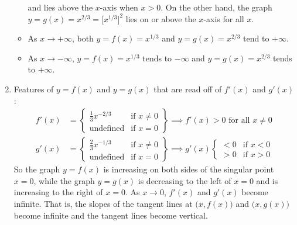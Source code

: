 \begin{eg}[Optional ---  $y=x^{1/3}$ and $y = x^{2/3}$]
\begin{enumerate}[(1)]
\begin{itemize}
   and lies above the $x$-axis when $x>0$. On the other hand, the graph
   $y=g(x)=x^{2/3}=\big[x^{1/3}\big]^2$ lies on or above the $x$-axis for all
   $x$.
  \item As $x\rightarrow+\infty$,  both $y=f(x)=x^{1/3}$ and   
   $y=g(x)=x^{2/3}$ tend to $+\infty$.
  \item As $x\rightarrow-\infty$, $y=f(x)=x^{1/3}$ tends to $-\infty$ and   
   $y=g(x)=x^{2/3}$ tends to $+\infty$.
\end{itemize}
\item Features of $y=f(x)$ and $y=g(x)$ that are read off of $f'(x)$ 
      and $g'(x)$:
      \begin{align*}
         f'(x) &=  \left.\begin{cases}
                      \tfrac{1}{3}x^{-2/3} & \text{if }x\ne 0 \\
                      \text{undefined} & \text{if }x =0  
              \end{cases}\right\}
              \implies f'(x)>0\text{ for all }x\ne 0 
              \\
          g'(x) &=  \left.\begin{cases}
                      \tfrac{2}{3}x^{-1/3} & \text{if }x\ne 0 \\
                      \text{undefined} & \text{if }x =0  
              \end{cases}\right\}
               \implies g'(x)
                    \begin{cases}<0&\text{if }x< 0\\ 
                                 >0&\text{if }x> 0
                    \end{cases} 
      \end{align*}
      So the graph $y=f(x)$ is increasing on both sides of the singular point   
      $x=0$, while the graph $y=g(x)$ is decreasing to the left of $x=0$ and
      is increasing to the right of $x=0$. As $x\rightarrow 0$, $f'(x)$ and
      $g'(x)$ become infinite. That is, the slopes of the tangent lines at
      $\big(x,f(x)\big)$ and $\big(x,g(x)\big)$ become infinite and the 
      tangent lines become vertical.
 

\end{enumerate}
\end{eg}
